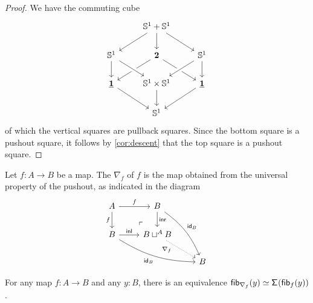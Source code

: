 \begin{proof}
We have the commuting cube
\begin{equation*}
\begin{tikzcd}
& \sphere{1}+\sphere{1} \arrow[dl] \arrow[d] \arrow[dr] \\
\sphere{1} \arrow[d] & \bool \arrow[dl] \arrow[dr] & \sphere{1} \arrow[dl,crossing over] \arrow[d] \\
\unit \arrow[dr] & \sphere{1}\times \sphere{1} \arrow[d] \arrow[from=ul,crossing over] & \unit \arrow[dl] \\
& \sphere{1}
\end{tikzcd}
\end{equation*}
of which the vertical squares are pullback squares. Since the bottom square is a pushout square, it follows by \cref{cor:descent} that the top square is a pushout square.
\end{proof}

\begin{defn}
Let $f:A\to B$ be a map. The  $\nabla_f$ of $f$ is the map obtained from the universal property of the pushout, as indicated in the diagram
\begin{equation*}
\begin{tikzcd}
A \arrow[d,swap,"f"] \arrow[r,"f"] \arrow[dr, phantom, "\ulcorner", very near end] & B \arrow[d,"\inr"] \arrow[ddr,bend left=15,"{\idfunc[B]}"] \\
B \arrow[r,"\inl"] \arrow[drr,bend right=15,swap,"{\idfunc[B]}"] & B\sqcup^{A} B \arrow[dr,densely dotted,near start,swap,"\nabla_f"] \\
& & B
\end{tikzcd}
\end{equation*}
\end{defn}

\begin{prp}
For any map $f:A\to B$ and any $y:B$, there is an equivalence $\eqv{\fib{\nabla_f}{y}}{\susp(\fib{f}{y})}$. 
\end{prp}

